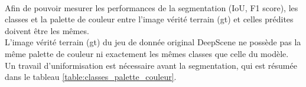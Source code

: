 ﻿
\vspace{\baselineskip}
\\
\noindent Afin de pouvoir mesurer les performances de la segmentation (IoU, F1 score), les classes et la palette de couleur entre l'image vérité terrain (\acrshort{gt}) et celles prédites doivent être les mêmes.
\vspace{\baselineskip}
\\
\noindent L'image vérité terrain (\acrshort{gt}) du jeu de donnée original DeepScene ne possède pas la même palette de couleur ni exactement les mêmes classes que celle du modèle.
\vspace{\baselineskip}
\\
\noindent Un travail d'uniformisation est nécessaire avant la segmentation, qui est résumée dans le tableau \ref{table:classes_palette_couleur}.
